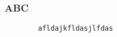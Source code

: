 \documentclass{beamer}
\begin{document}
	\begin{frame}[fragile=singleslide]
		\frametitle{ABC}
		\begin{verbatim}
		afldajkfldasjlfdas
		\end{verbatim}
	\end{frame}
\end{document}
